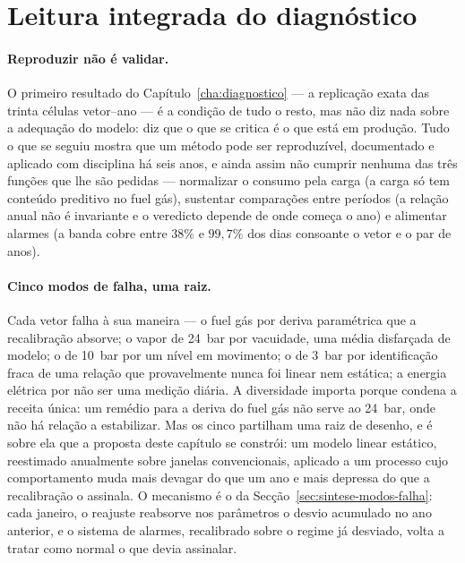 \section{Leitura integrada do diagnóstico}
\label{sec:leitura-integrada}

\paragraph{Reproduzir não é validar.} O primeiro resultado do
Capítulo~\ref{cha:diagnostico} --- a replicação exata das trinta células
vetor--ano --- é a condição de tudo o resto, mas não diz nada sobre a
adequação do modelo: diz que o que se critica é o que está em produção.
Tudo o que se seguiu mostra que um método pode ser reproduzível, documentado
e aplicado com disciplina há seis anos, e ainda assim não cumprir nenhuma
das três funções que lhe são pedidas --- normalizar o consumo pela carga
(a carga só tem conteúdo preditivo no fuel gás), sustentar comparações entre
períodos (a relação anual não é invariante e o veredicto depende de onde
começa o ano) e alimentar alarmes (a banda cobre entre $38\%$ e $99{,}7\%$
dos dias consoante o vetor e o par de anos).

\paragraph{Cinco modos de falha, uma raiz.} Cada vetor falha à sua maneira
--- o fuel gás por deriva paramétrica que a recalibração absorve; o vapor de
24~bar por vacuidade, uma média disfarçada de modelo; o de 10~bar por um
nível em movimento; o de 3~bar por identificação fraca de uma relação que
provavelmente nunca foi linear nem estática; a energia elétrica por não ser
uma medição diária. A diversidade importa porque condena a receita única: um
remédio para a deriva do fuel gás não serve ao 24~bar, onde não há relação a
estabilizar. Mas os cinco partilham uma raiz de desenho, e é sobre ela que a
proposta deste capítulo se constrói: um modelo linear estático, reestimado
anualmente sobre janelas convencionais, aplicado a um processo cujo
comportamento muda mais devagar do que um ano e mais depressa do que a
recalibração o assinala. O mecanismo é o da Secção~\ref{sec:sintese-modos-falha}:
cada janeiro, o reajuste reabsorve nos parâmetros o desvio acumulado no ano
anterior, e o sistema de alarmes, recalibrado sobre o regime já desviado,
volta a tratar como normal o que devia assinalar.

